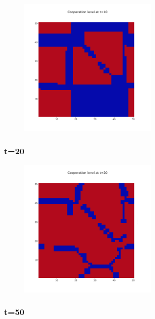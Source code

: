 \documentclass[11pt]{article}
\begin{document}
\begin{figure}[H]
\centering
   \includegraphics[width=0.6\textwidth]{img/part1/cf-moore-visu-10.png}
\end{figure}

\subsubsection{t=20}

\begin{figure}[H]
\centering
   \includegraphics[width=0.6\textwidth]{img/part1/cf-moore-visu-20.png}
\end{figure}

\subsubsection{t=50}
\end{document}
